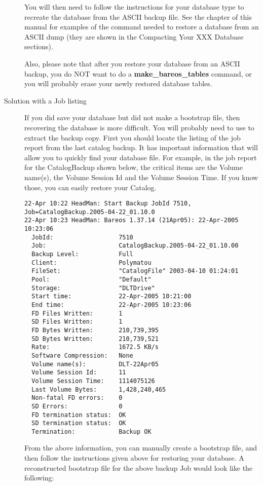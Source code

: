 \begin{description}
   You will then need to follow the instructions for your
   database type to recreate the database from the ASCII backup file.
   See the  chapter of
   this manual for examples of the command needed to restore a
   database from an ASCII dump (they are shown in the Compacting Your
   XXX Database sections).

   Also, please note that after you restore your database from an ASCII
   backup, you do NOT want to do a {\bf make\_bareos\_tables}  command, or
   you will probably erase your newly restored database tables.


\item[Solution with a Job listing]
   If you did save your database but did not make a bootstrap file, then
   recovering the database is more difficult.  You will probably need to
   use  to extract the backup copy.  First you should locate the
   listing of the job report from the last catalog backup.  It has
   important information that will allow you to quickly find your database
   file.  For example, in the job report for the CatalogBackup shown below,
   the critical items are the Volume name(s), the Volume Session Id and the
   Volume Session Time.  If you know those, you can easily restore your
   Catalog.

\footnotesize
\begin{verbatim}
22-Apr 10:22 HeadMan: Start Backup JobId 7510,
Job=CatalogBackup.2005-04-22_01.10.0
22-Apr 10:23 HeadMan: Bareos 1.37.14 (21Apr05): 22-Apr-2005 10:23:06
  JobId:                  7510
  Job:                    CatalogBackup.2005-04-22_01.10.00
  Backup Level:           Full
  Client:                 Polymatou
  FileSet:                "CatalogFile" 2003-04-10 01:24:01
  Pool:                   "Default"
  Storage:                "DLTDrive"
  Start time:             22-Apr-2005 10:21:00
  End time:               22-Apr-2005 10:23:06
  FD Files Written:       1
  SD Files Written:       1
  FD Bytes Written:       210,739,395
  SD Bytes Written:       210,739,521
  Rate:                   1672.5 KB/s
  Software Compression:   None
  Volume name(s):         DLT-22Apr05
  Volume Session Id:      11
  Volume Session Time:    1114075126
  Last Volume Bytes:      1,428,240,465
  Non-fatal FD errors:    0
  SD Errors:              0
  FD termination status:  OK
  SD termination status:  OK
  Termination:            Backup OK
\end{verbatim}
\normalsize

  From the above information, you can manually create a bootstrap file,
  and then follow the instructions given above for restoring your database.
  A reconstructed bootstrap file for the above backup Job would look
  like the following:


\end{description}
